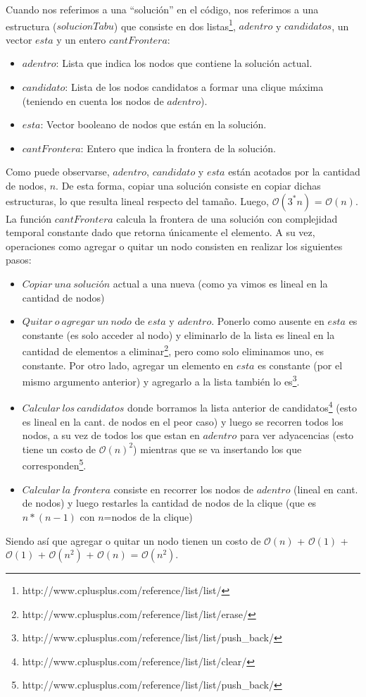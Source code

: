  Cuando nos referimos a una ``solución'' en el código, nos referimos a una estructura ($solucionTabu$) que consiste en dos listas\footnote{http://www.cplusplus.com/reference/list/list/}, $adentro$ y $candidatos$, un vector $esta$ y un entero $cantFrontera$:
\begin{itemize}
 \item $adentro$: Lista que indica los nodos que contiene la solución actual.
 \item $candidato$: Lista de los nodos candidatos a formar una clique máxima (teniendo en cuenta los nodos de $adentro$). 
 \item $esta$: Vector booleano de nodos que están en la solución.
 \item $cantFrontera$: Entero que indica la frontera de la solución.\newline
\end{itemize}
 Como puede observarse, $adentro$, $candidato$ y $esta$ están acotados por la cantidad de nodos, $n$. De esta forma, copiar una solución consiste en copiar dichas estructuras, lo que resulta lineal respecto del tamaño. Luego, $\mathcal{O}(3^*n)$ = $\mathcal{O}(n)$.\newline 
 La función $cantFrontera$ calcula la frontera de una solución con complejidad temporal constante dado que retorna únicamente el elemento. A su vez, operaciones como agregar o quitar un nodo consisten en realizar los siguientes pasos: \newline
\begin{itemize}
 \item $Copiar\ una\ solución$ actual a una nueva (como ya vimos es lineal en la cantidad de nodos)
 \item $Quitar\ o\ agregar\ un\ nodo$ de $esta$ y $adentro$. Ponerlo como ausente en $esta$ es constante (es solo acceder al nodo) y eliminarlo de la lista es lineal en la cantidad de elementos a eliminar\footnote{http://www.cplusplus.com/reference/list/list/erase/}, pero como solo eliminamos uno, es constante. Por otro lado, agregar un elemento en $esta$ es constante (por el mismo argumento anterior) y agregarlo a la lista también lo es\footnote{http://www.cplusplus.com/reference/list/list/push\_back/}.
 \item $Calcular\ los\ candidatos$ donde borramos la lista anterior de candidatos\footnote{http://www.cplusplus.com/reference/list/list/clear/} (esto es lineal en la cant. de nodos en el peor caso) y luego se recorren todos los nodos, a su vez de todos los que estan en $adentro$ para ver adyacencias (esto tiene un costo de $\mathcal{O}(n)^{2}$) mientras que se va insertando los que corresponden\footnote{http://www.cplusplus.com/reference/list/list/push\_back/}.
 \item $Calcular\ la\ frontera$ consiste en recorrer los nodos de $adentro$ (lineal en cant. de nodos) y luego restarles la cantidad de nodos de la clique (que es $n*(n-1)$ con $n$=nodos de la clique)
\end{itemize}
 Siendo así que agregar o quitar un nodo tienen un costo de $\mathcal{O}(n)$ + $\mathcal{O}(1)$ + $\mathcal{O}(1)$ + $\mathcal{O}(n^2)$ + $\mathcal{O}(n)$ = $\mathcal{O}(n^2)$.\newline

